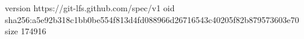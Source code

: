 version https://git-lfs.github.com/spec/v1
oid sha256:a5e92b318c1bb0be554f813d4fd088966d26716543c40205f82b879573603e70
size 174916
